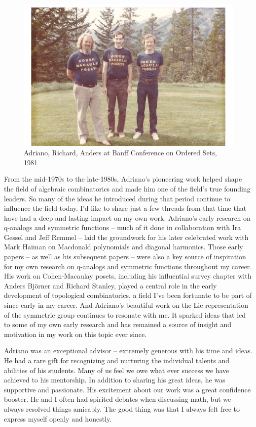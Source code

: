 \documentclass{notices}
\begin{document}
\begin{figure}
    \centering
    \includegraphics[width=0.95\linewidth]{Michelle_Wachs/cmposets.pdf} 
  {\footnotesize Adriano, Richard, Anders at Banff Conference on Ordered Sets, 1981}
    \end{figure}
From the mid-1970s to the late-1980s, Adriano's pioneering work helped shape the field of algebraic combinatorics and made him  one of the field's true founding leaders. So many of the ideas he introduced during that  period continue to influence the field today. I’d like to share just a few threads from that time that have had a deep and lasting impact on my own work.
 Adriano’s early research on 
q-analogs and symmetric functions -- much of it done in collaboration with Ira Gessel and Jeff Remmel -- laid the groundwork for his later celebrated work with Mark Haiman on Macdonald polynomials and diagonal harmonics. Those early papers -- as well as his subsequent papers --  were also a key source of inspiration for my own research on 
q-analogs and symmetric functions throughout my career. His work on Cohen-Macaulay posets, including his influential survey chapter  with Anders Bj\"orner and Richard Stanley, played a central role in the early development of topological combinatorics,  a field I’ve been fortunate to be part of since  early in my career. And Adriano’s beautiful work on the Lie representation of the symmetric group continues to resonate with me. It sparked ideas that led to some of my own early research and has remained a source of insight and motivation in my work on this topic ever since.

Adriano was an exceptional advisor -- extremely generous with his time and ideas. He had a rare gift for recognizing and nurturing the individual talents and abilities of his students.   Many of us feel we owe what ever success we have achieved to his mentorship.  In addition to sharing his great ideas, he was supportive and passionate.  His excitement about our work was a great confidence booster.  He and I often had spirited debates when discussing math,  but we always resolved things amicably.   The good thing was that I always felt free to express myself openly and honestly. 
\end{document}
